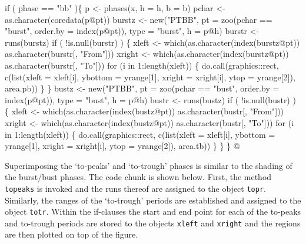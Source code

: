 \documentclass[a4paper]{article}
\begin{document}
\nwenddocs{}\endmoddef
if ( phase  == "bb" )\{
    p <- phases(x, h = h, b = b)
    pchar <- as.character(coredata(p@pt))
    burstz <- new("PTBB",
                  pt = zoo(pchar == "burst",
                           order.by = index(p@pt)),
                  type = "burst",
                  h = p@h)
    burstr <- runs(burstz)
    if ( !is.null(burstr) ) \{
        xleft <- which(as.character(index(burstz@pt)) %
                       as.character(burstr[, "From"]))
        xright <- which(as.character(index(burstz@pt)) %
                        as.character(burstr[, "To"]))
        for (i in 1:length(xleft)) \{
            do.call(graphics::rect, c(list(xleft = xleft[i],
                                           ybottom = yrange[1],
                                           xright = xright[i],
                                           ytop = yrange[2]),
                                      area.pb))
        \}
    \}
    bustz <- new("PTBB",
                 pt = zoo(pchar == "bust",
                          order.by = index(p@pt)),
                 type = "bust",
                 h = p@h)
    bustr <- runs(bustz)
    if ( !is.null(bustr) ) \{
        xleft <- which(as.character(index(bustz@pt)) %
                       as.character(bustr[, "From"]))
        xright <- which(as.character(index(bustz@pt)) %
                        as.character(bustr[, "To"]))
        for (i in 1:length(xleft)) \{
            do.call(graphics::rect, c(list(xleft = xleft[i],
                                           ybottom = yrange[1],
                                           xright = xright[i],
                                           ytop = yrange[2]),
                                      area.tb))
        \}
    \}
\}
\nwendcode{}@

Superimposing the `to-peaks' and `to-trough' phases is similar to the
shading of the burst/bust phases. The code chunk is shown
below. First, the method \verb?topeaks? is invoked and the runs thereof
are assigned to the object \verb?topr?. Similarly, the ranges of the
`to-trough' periods are established and assigned to the object
\verb?totr?. Within the if-clauses the start and end point for each of the
to-peaks and to-trough periods are stored to the objects \verb?xleft? and
\verb?xright? and the regions are then plotted on top of the figure.
\end{document}
